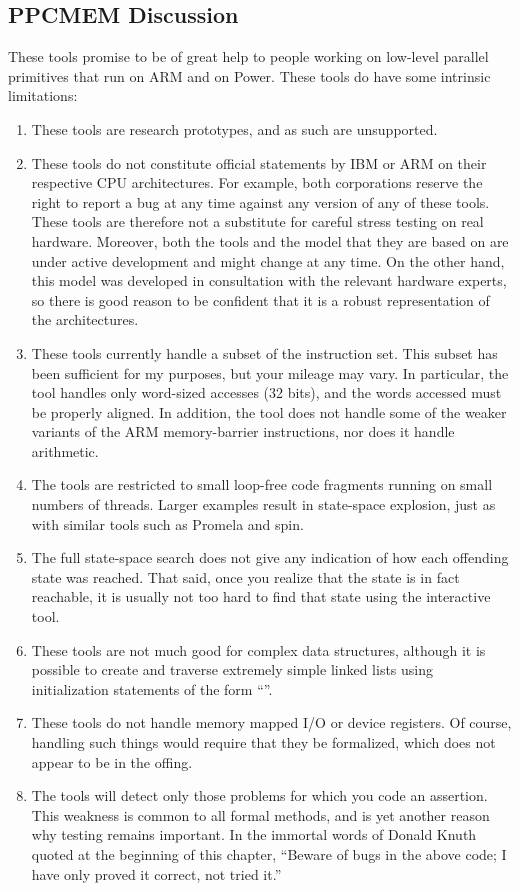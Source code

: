\subsection{PPCMEM Discussion}
\label{sec:formal:PPCMEM Discussion}

These tools promise to be of great help to people working on low-level
parallel primitives that run on ARM and on Power. These tools do have
some intrinsic limitations:

\begin{enumerate}
\item	These tools are research prototypes, and as such are unsupported.
\item	These tools do not constitute official statements by IBM or ARM
	on their respective CPU architectures. For example, both
	corporations reserve the right to report a bug at any time against
	any version of any of these tools. These tools are therefore not a
	substitute for careful stress testing on real hardware. Moreover,
	both the tools and the model that they are based on are under
	active development and might change at any time. On the other
	hand, this model was developed in consultation with the relevant
	hardware experts, so there is good reason to be confident that
	it is a robust representation of the architectures.
\item	These tools currently handle a subset of the instruction set.
	This subset has been sufficient for my purposes, but your mileage
	may vary. In particular, the tool handles only word-sized accesses
	(32 bits), and the words accessed must be properly aligned. In
	addition, the tool does not handle some of the weaker variants
	of the ARM memory-barrier instructions, nor does it handle arithmetic.
\item	The tools are restricted to small loop-free code fragments
	running on small numbers of threads. Larger examples result
	in state-space explosion, just as with similar tools such as
	Promela and spin.
\item	The full state-space search does not give any indication of how
	each offending state was reached. That said, once you realize
	that the state is in fact reachable, it is usually not too hard
	to find that state using the interactive tool.
\item	These tools are not much good for complex data structures, although
	it is possible to create and traverse extremely simple linked
	lists using initialization statements of the form
	``''.
\item	These tools do not handle memory mapped I/O or device registers.
	Of course, handling such things would require that they be
	formalized, which does not appear to be in the offing.
\item	The tools will detect only those problems for which you code an
	assertion. This weakness is common to all formal methods, and
	is yet another reason why testing remains important. In the
	immortal words of Donald Knuth quoted at the beginning of this
	chapter, ``Beware of bugs in the above
	code; I have only proved it correct, not tried it.''
\end{enumerate}

